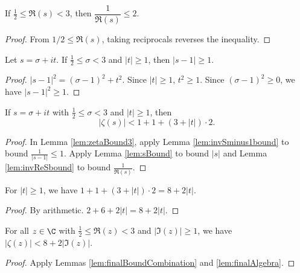 \begin{lemma}\label{lem:invReSbound}
\leanok
If $\tfrac{1}{2} \le \Re(s) < 3$, then $\dfrac{1}{\Re(s)} \le 2$.
\end{lemma}
\begin{proof}
\leanok
From $1/2 \le \Re(s)$, taking reciprocals reverses the inequality.
\end{proof}

\begin{lemma}\label{lem:invSminus1bound}
\leanok
Let $s=\sigma+it$. If $\tfrac{1}{2} \le \sigma < 3$ and $|t|\ge 1$, then $|s-1| \ge 1$.
\end{lemma}
\begin{proof}
\leanok
$|s-1|^2 = (\sigma-1)^2 + t^2$. Since $|t|\ge 1$, $t^2\ge 1$. Since $(\sigma-1)^2 \ge 0$, we have $|s-1|^2 \ge 1$.
\end{proof}

\begin{lemma}\label{lem:finalBoundCombination}
\leanok
If $s=\sigma+it$ with $\tfrac{1}{2} \le \sigma < 3$ and $|t|\ge 1$, then
\[ |\zeta(s)| < 1 + 1 + (3+|t|) \cdot 2. \]
\end{lemma}
\begin{proof}
\leanok
{}
In Lemma \ref{lem:zetaBound3}, apply Lemma \ref{lem:invSminus1bound} to bound $\frac{1}{|s-1|} \le 1$. Apply Lemma \ref{lem:sBound} to bound $|s|$ and Lemma \ref{lem:invReSbound} to bound $\frac{1}{\Re(s)}$.
\end{proof}

\begin{lemma}\label{lem:finalAlgebra}
\leanok
For $|t|\ge 1$, we have $1 + 1 + (3+|t|) \cdot 2 = 8 + 2|t|$.
\end{lemma}
\begin{proof}
\leanok
By arithmetic. $2 + 6 + 2|t| = 8+2|t|$.
\end{proof}

\begin{lemma}\label{lem:zetaUppBd}
\leanok
For all $z\in\C$ with $\tfrac{1}{2} \le \Re(z) < 3$ and $|\Im(z)|\ge 1$, we have $|\zeta(z)| < 8+2|\Im(z)|$.
\end{lemma}
\begin{proof}
\leanok
{}
Apply Lemmas \ref{lem:finalBoundCombination} and \ref{lem:finalAlgebra}.
\end{proof}

